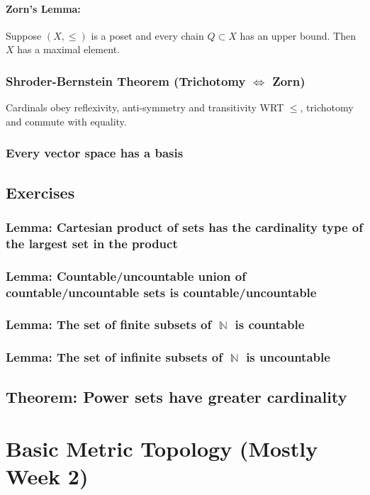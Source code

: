\documentclass{article}
\DeclareMathOperator\N{\mathbb{N}}
\begin{document}
\paragraph{Zorn's Lemma:}
Suppose $(X,\leq)$ is a poset and every chain $Q \subset X$ has an upper bound.
Then $X$ has a maximal element.
\subsubsection*{Shroder-Bernstein Theorem (Trichotomy $\iff$ Zorn)}
Cardinals obey reflexivity, anti-symmetry and transitivity WRT $\leq$,
trichotomy and commute with equality.
\subsubsection*{Every vector space has a basis}

\subsection*{Exercises}
\subsubsection*{Lemma: Cartesian product of sets has the cardinality type of the largest set in the product}

\subsubsection*{Lemma: Countable/uncountable union of countable/uncountable sets is countable/uncountable}

\subsubsection*{Lemma: The set of finite subsets of $\N$ is countable}

\subsubsection*{Lemma: The set of infinite subsets of $\N$ is uncountable}

\subsection*{Theorem: Power sets have greater cardinality}

\section*{Basic Metric Topology (Mostly Week 2)}
\end{document}
